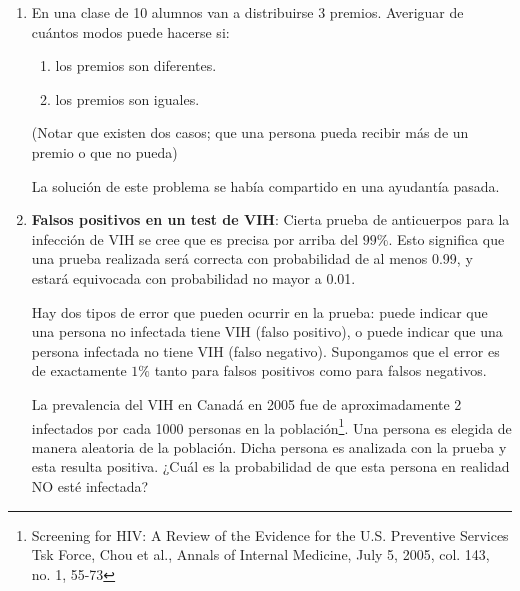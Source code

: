 \documentclass{article}
\renewcommand{\P}[1]{P\left(#1\right)}
\begin{document}
\begin{enumerate}
\begin{proof}[Solución]
\begin{enumerate}
    \[\P{A_5}=\frac{6\cdot 5\cdot 5}{6^5}=\frac{25}{1296}.\]
    
    \item Finalmente, sea $A_6=\{\text{quintilla y nada mejor}\}$. Observamos que hay $6$ posibilidades para nombrar la quintilla, el palo que se repetirá cinco veces. Sólo hay una posibilidad para la configuración de los dados en la quintilla, por lo cual
    
    \[\P{A_6}=\frac{6}{6^5}=\frac{1}{1296}.\]
    
\end{enumerate}

    \end{proof}

    \item En una clase de 10 alumnos van a distribuirse 3 premios. Averiguar de cuántos modos puede hacerse si:

    \begin{enumerate}
        \item los premios son diferentes.
        \item los premios son iguales.
    \end{enumerate}

    (Notar que existen dos casos; que una persona pueda recibir más de un premio o que no pueda)

    La solución de este problema se había compartido en una ayudantía pasada.



    \item \textbf{Falsos positivos en un test de VIH}: Cierta prueba de anticuerpos para la infección de VIH se cree que es precisa por arriba del $99\%$. Esto significa que una prueba realizada será correcta con probabilidad de al menos 0.99, y estará equivocada con probabilidad no mayor a 0.01. 
    
    Hay dos tipos de error que pueden ocurrir en la prueba: puede indicar que una persona no infectada tiene VIH (falso positivo), o puede indicar que una persona infectada no tiene VIH (falso negativo). Supongamos que el error es de exactamente $1\%$ tanto para falsos positivos como para falsos negativos.
    
    La prevalencia del VIH en Canadá en 2005 fue de aproximadamente 2 infectados por cada 1000 personas en la población\footnote[1]{Screening for HIV: A Review of the Evidence for the U.S. Preventive Services Tsk Force, Chou et al., Annals of Internal Medicine, July 5, 2005, col. 143, no. 1, 55-73}. Una persona es elegida de manera aleatoria de la población. Dicha persona es analizada con la prueba y esta resulta positiva. ¿Cuál es la probabilidad de que esta persona en realidad NO esté infectada?



\end{enumerate}
\end{document}
